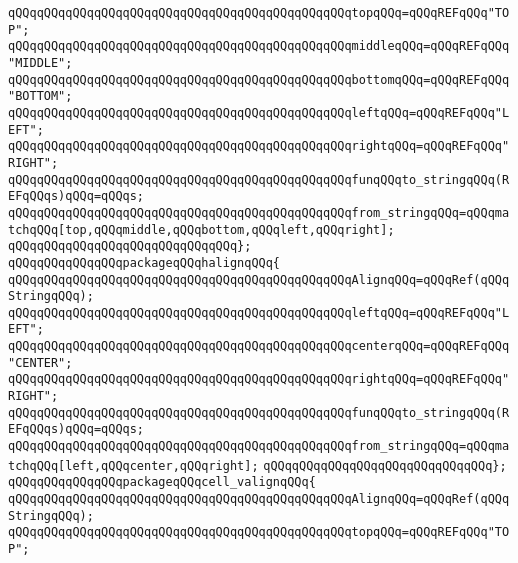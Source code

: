 \verb|qQQqqQQqqQQqqQQqqQQqqQQqqQQqqQQqqQQqqQQqqQQqqQQqtopqQQq=qQQqREFqQQq"TOP";|\newline
\verb|qQQqqQQqqQQqqQQqqQQqqQQqqQQqqQQqqQQqqQQqqQQqqQQqmiddleqQQq=qQQqREFqQQq"MIDDLE";|\newline
\verb|qQQqqQQqqQQqqQQqqQQqqQQqqQQqqQQqqQQqqQQqqQQqqQQqbottomqQQq=qQQqREFqQQq"BOTTOM";|\newline
\verb|qQQqqQQqqQQqqQQqqQQqqQQqqQQqqQQqqQQqqQQqqQQqqQQqleftqQQq=qQQqREFqQQq"LEFT";|\newline
\verb|qQQqqQQqqQQqqQQqqQQqqQQqqQQqqQQqqQQqqQQqqQQqqQQqrightqQQq=qQQqREFqQQq"RIGHT";|\newline
\verb|qQQqqQQqqQQqqQQqqQQqqQQqqQQqqQQqqQQqqQQqqQQqqQQqfunqQQqto_stringqQQq(REFqQQqs)qQQq=qQQqs;|\newline
\verb|qQQqqQQqqQQqqQQqqQQqqQQqqQQqqQQqqQQqqQQqqQQqqQQqfrom_stringqQQq=qQQqmatchqQQq[top,qQQqmiddle,qQQqbottom,qQQqleft,qQQqright];|\newline
\verb|qQQqqQQqqQQqqQQqqQQqqQQqqQQqqQQq};|\newline
\newline
\verb|qQQqqQQqqQQqqQQqpackageqQQqhalignqQQq{|\newline
\newline
\verb|qQQqqQQqqQQqqQQqqQQqqQQqqQQqqQQqqQQqqQQqqQQqqQQqAlignqQQq=qQQqRef(qQQqStringqQQq);|\newline
\verb|qQQqqQQqqQQqqQQqqQQqqQQqqQQqqQQqqQQqqQQqqQQqqQQqleftqQQq=qQQqREFqQQq"LEFT";|\newline
\verb|qQQqqQQqqQQqqQQqqQQqqQQqqQQqqQQqqQQqqQQqqQQqqQQqcenterqQQq=qQQqREFqQQq"CENTER";|\newline
\verb|qQQqqQQqqQQqqQQqqQQqqQQqqQQqqQQqqQQqqQQqqQQqqQQqrightqQQq=qQQqREFqQQq"RIGHT";|\newline
\verb|qQQqqQQqqQQqqQQqqQQqqQQqqQQqqQQqqQQqqQQqqQQqqQQqfunqQQqto_stringqQQq(REFqQQqs)qQQq=qQQqs;|\newline
\verb|qQQqqQQqqQQqqQQqqQQqqQQqqQQqqQQqqQQqqQQqqQQqqQQqfrom_stringqQQq=qQQqmatchqQQq[left,qQQqcenter,qQQqright];|\newline
\verb|qQQqqQQqqQQqqQQqqQQqqQQqqQQqqQQq};|\newline
\newline
\verb|qQQqqQQqqQQqqQQqpackageqQQqcell_valignqQQq{|\newline
\newline
\verb|qQQqqQQqqQQqqQQqqQQqqQQqqQQqqQQqqQQqqQQqqQQqqQQqAlignqQQq=qQQqRef(qQQqStringqQQq);|\newline
\verb|qQQqqQQqqQQqqQQqqQQqqQQqqQQqqQQqqQQqqQQqqQQqqQQqtopqQQq=qQQqREFqQQq"TOP";|\newline
